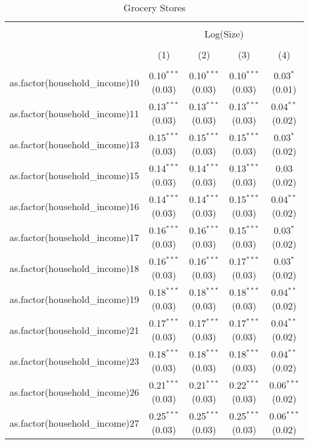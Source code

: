 
\begin{table}[!htbp] \centering 
  \caption{Grocery Stores} 
  \label{tab:packageSizeGroceryLiqAppendix} 
\begin{tabular}{@{\extracolsep{5pt}}lcccc} 
\\[-1.8ex]\hline 
\hline \\[-1.8ex] 
 & \multicolumn{4}{c}{Log(Size)} \\ 
\\[-1.8ex] & (1) & (2) & (3) & (4)\\ 
\hline \\[-1.8ex] 
 as.factor(household\_income)10 & 0.10$^{***}$ (0.03) & 0.10$^{***}$ (0.03) & 0.10$^{***}$ (0.03) & 0.03$^{*}$ (0.01) \\ 
  as.factor(household\_income)11 & 0.13$^{***}$ (0.03) & 0.13$^{***}$ (0.03) & 0.13$^{***}$ (0.03) & 0.04$^{**}$ (0.02) \\ 
  as.factor(household\_income)13 & 0.15$^{***}$ (0.03) & 0.15$^{***}$ (0.03) & 0.15$^{***}$ (0.03) & 0.03$^{*}$ (0.02) \\ 
  as.factor(household\_income)15 & 0.14$^{***}$ (0.03) & 0.14$^{***}$ (0.03) & 0.13$^{***}$ (0.03) & 0.03 (0.02) \\ 
  as.factor(household\_income)16 & 0.14$^{***}$ (0.03) & 0.14$^{***}$ (0.03) & 0.15$^{***}$ (0.03) & 0.04$^{**}$ (0.02) \\ 
  as.factor(household\_income)17 & 0.16$^{***}$ (0.03) & 0.16$^{***}$ (0.03) & 0.15$^{***}$ (0.03) & 0.03$^{*}$ (0.02) \\ 
  as.factor(household\_income)18 & 0.16$^{***}$ (0.03) & 0.16$^{***}$ (0.03) & 0.17$^{***}$ (0.03) & 0.03$^{*}$ (0.02) \\ 
  as.factor(household\_income)19 & 0.18$^{***}$ (0.03) & 0.18$^{***}$ (0.03) & 0.18$^{***}$ (0.03) & 0.04$^{**}$ (0.02) \\ 
  as.factor(household\_income)21 & 0.17$^{***}$ (0.03) & 0.17$^{***}$ (0.03) & 0.17$^{***}$ (0.03) & 0.04$^{**}$ (0.02) \\ 
  as.factor(household\_income)23 & 0.18$^{***}$ (0.03) & 0.18$^{***}$ (0.03) & 0.18$^{***}$ (0.03) & 0.04$^{**}$ (0.02) \\ 
  as.factor(household\_income)26 & 0.21$^{***}$ (0.03) & 0.21$^{***}$ (0.03) & 0.22$^{***}$ (0.03) & 0.06$^{***}$ (0.02) \\ 
  as.factor(household\_income)27 & 0.25$^{***}$ (0.03) & 0.25$^{***}$ (0.03) & 0.25$^{***}$ (0.03) & 0.06$^{***}$ (0.02) \\ 

\end{tabular}
\end{table}

